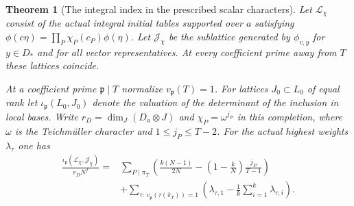 \documentclass[a4paper,11pt]{article}
\newtheorem{theorem}[proposition]{Theorem}
\theoremstyle{definition}
\theoremstyle{remark}
\numberwithin{equation}{section}
\begin{document}
\begin{theorem}[The integral index in the prescribed scalar characters]
\label{thm:initialindex396}
Let \(\mathcal L_\chi\) consist of the actual integral
initial tables supported over \(a\) satisfying
\(\phi(c\eta)=\prod_P\chi_P(c_P)\phi(\eta)\).
Let \(\mathcal J_\chi\) be the sublattice generated by
\(\phi_{v,y}\) for \(y\in D_*\) and for all vector representatives.
At every coefficient prime away from \(T\) these lattices coincide.

At a coefficient prime \(\mathfrak p\mid T\) normalize
\(v_\mathfrak p(T)=1\). For lattices \(J_0\subset L_0\)
of equal rank let \(\iota_\mathfrak p(L_0,J_0)\) denote the
valuation of the determinant of the inclusion in local bases.
Write \(r_D=\dim_J(D_a\otimes J)\) and
\(\chi_P=\omega^{j_P}\) in this completion, where \(\omega\)
is the Teichm\"uller character and \(1\le j_P\le T-2\).
For the actual highest weights \(\lambda_\tau\) one has
\[
\begin{split}
 \frac{\iota_\mathfrak p(\mathcal L_\chi,\mathcal J_\chi)}
                 {r_D N^f}
   =&\sum_{P\mid\pi_T}
       \left(\frac{k(N-1)}{2N}
                    -\left(1-\frac{k}{N}\right)\frac{j_P}{T-1}\right)\\
    &+\sum_{\tau:\,v_\mathfrak p(\tau(\bar\pi_T))=1}
       \left(\lambda_{\tau,1}
                      -\frac1k\sum_{i=1}^k\lambda_{\tau,i}\right).
\end{split}
\]
\end{theorem}
\end{document}

